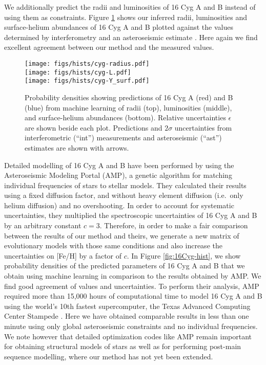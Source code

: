 \documentclass[iop,apj,twocolappendix]{emulateapj}
\begin{document}
We additionally predict the radii and luminosities of 16 Cyg A and B instead of using them as constraints. Figure \ref{fig:interferometry} shows our inferred radii, luminosities and surface-helium abundances of 16 Cyg A and B plotted against the values determined by interferometry \citep{2013MNRAS.433.1262W} and an asteroseismic estimate \citep{2014ApJ...790..138V}. Here again we find excellent agreement between our method and the measured values. 

\begin{figure}
    \centering
    \texttt{[image: figs/hists/cyg-radius.pdf]}\\
    \texttt{[image: figs/hists/cyg-L.pdf]}\\
    \texttt{[image: figs/hists/cyg-Y\_surf.pdf]}
    \caption{Probability densities showing predictions of 16 Cyg A (red) and B (blue) from machine learning of radii (top), luminosities (middle), and surface-helium abundances (bottom). Relative uncertainties $\epsilon$ are shown beside each plot. Predictions and $2\sigma$ uncertainties from interferometric (``int'') measurements and asteroseismic (``ast'') estimates are shown with arrows.}
    \label{fig:interferometry}
\end{figure}

Detailed modelling of 16 Cyg A and B have been performed  by \citet{2015ApJ...811L..37M} using the Asteroseismic Modeling Portal (AMP), a genetic algorithm for matching individual frequencies of stars to stellar models. They calculated their results using a fixed diffusion factor, and without heavy element diffusion (i.e.\ only helium diffusion) and no overshooting. In order to account for systematic uncertainties, they multiplied the spectroscopic uncertainties of 16 Cyg A and B by an arbitrary constant $c=3$. Therefore, in order to make a fair comparison between the results of our method and theirs, we generate a new matrix of evolutionary models with those same conditions and also increase the uncertainties on [Fe/H] by a factor of $c$. In Figure \ref{fig:16Cyg-hist}, we show probability densities of the predicted parameters of 16 Cyg A and B that we obtain using machine learning in comparison to the results obtained by AMP. We find good agreement of values and uncertainties. To perform their analysis, AMP required more than 15,000 hours of computational time to model 16 Cyg A and B using the world's 10th fastest supercomputer, the Texas Advanced Computing Center Stampede \citep{TOP500}. Here we have obtained comparable results in less than one minute using only global asteroseismic constraints and no individual frequencies. We note however that detailed optimization codes like AMP remain important for obtaining structural models of stars as well as for performing post-main sequence modelling, where our method has not yet been extended. 
\end{document}
